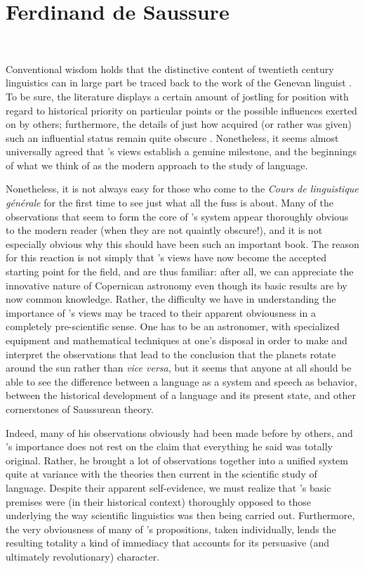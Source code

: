 \chapter{Ferdinand de Saussure}
\label{ch.saussure_life}\

Conventional wisdom holds that the distinctive content of twentieth
century linguistics can in large part be traced back to the work of
the Genevan linguist .  To be sure, the
literature displays a certain amount of jostling for position with
regard to historical priority on particular points or the possible
influences exerted on {\Saussure} by others; furthermore, the details of
just how {\Saussure} acquired (or rather was given) such an influential
status remain quite obscure
\citep{percival77:rvw.koerner.saussure}. Nonetheless, it seems almost
universally agreed that {\Saussure}'s views establish a genuine
milestone, and the beginnings of what we think of as the modern
approach to the study of language.

Nonetheless, it is not always easy for those who come to the
\textsl{Cours de linguistique g\'en\'erale} \citep{saussure:cours} for
the first time to see just what all the fuss is about. Many of the
observations that seem to form the core of {\Saussure}'s system appear
thoroughly obvious to the modern reader (when they are not quaintly
obscure!), and it is not especially obvious why this should have been
such an important book.  The reason for this reaction is not simply
that {\Saussure}'s views have now become the accepted starting point for
the field, and are thus familiar: after all, we can appreciate the
innovative nature of Copernican astronomy even though its basic
results are by now common knowledge. Rather, the difficulty we have in
understanding the importance of {\Saussure}'s views may be traced to
their apparent obviousness in a completely pre-scientific sense.  One
has to be an astronomer, with specialized equipment and mathematical
techniques at one's disposal in order to make and interpret the
observations that lead to the conclusion that the planets rotate
around the sun rather than \emph{vice versa}, but it seems that anyone
at all should be able to see the difference between a language as a
system and speech as behavior, between the historical development of a
language and its present state, and other cornerstones of Saussurean
theory.

Indeed, many of his observations obviously had been made before by
others, and {\Saussure}'s importance does not rest on the claim that
everything he said was totally original.  Rather, he brought a lot of
observations together into a unified system quite at variance with the
theories then current in the scientific study of language.  Despite
their apparent self-evidence, we must realize that {\Saussure}'s basic
premises were (in their historical context) thoroughly opposed to
those underlying the way scientific linguistics was then being carried
out.  Furthermore, the very obviousness of many of {\Saussure}'s
propositions, taken individually, lends the resulting totality a kind
of immediacy that accounts for its persuasive (and ultimately
revolutionary) character.

